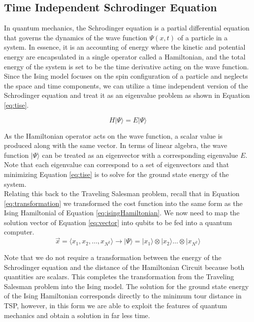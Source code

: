 \subsection{Time Independent Schrodinger Equation}
In quantum mechanics, the Schrodinger equation is a partial differential equation that governs the dynamics of the wave function $\Psi(x,t)$ of a particle in a system. 
In essence, it is an accounting of energy where the kinetic and potential energy are encapsulated in a single operator called a Hamiltonian, and the total energy of the system is set to be the time derivative acting on the wave function. 
Since the Ising model focuses on the spin configuration of a particle and neglects the space and time components, we can utilize a time independent version of the Schrodinger equation and treat it as an eigenvalue problem as shown in Equation \ref{eq:tise}. 

\begin{equation}
	H | \Psi \rangle = E | \Psi \rangle
	\label{eq:tise}
\end{equation}

As the Hamiltonian operator acts on the wave function, a scalar value is produced along with the same vector. 
In terms of linear algebra, the wave function $| \Psi \rangle$ can be treated as an eigenvector with a corresponding eigenvalue $E$. 
Note that each eigenvalue can correspond to a set of eigenvectors and that minimizing Equation \ref{eq:tise} is to solve for the ground state energy of the system. \\


Relating this back to the Traveling Salesman problem, recall that in Equation \ref{eq:transformation} we transformed the cost function into the same form as the Ising Hamiltonial of Equation \ref{eq:isingHamiltonian}. We now need to map the solution vector of Equation \ref{eq:vector} into qubits to be fed into a quantum computer. 
\begin{equation}
	\vec{x} = \langle x_1, x_2, \dots, x_{N^2} \rangle \rightarrow |\Psi\rangle = |x_1\rangle \otimes |x_2\rangle \dots \otimes  |x_{N^2}\rangle 
\end{equation}

Note that we do not require a transformation between the energy of the Schrodinger equation and the distance of the Hamiltonian Circuit because both quantities are scalars. This completes the transformation from the Traveling Salesman problem into the Ising model. The solution for the ground state energy of the Ising Hamiltonian corresponds directly to the minimum tour distance in TSP, however, in this form we are able to exploit the features of quantum mechanics and obtain a solution in far less time. 